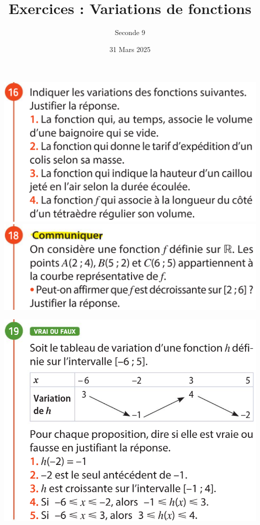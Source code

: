 \documentclass{article}
\title{Exercices : Variations de fonctions}
\author{Seconde 9}
\date{31 Mars 2025}
\begin{document}
\maketitle

\begin{center}
\begin{minipage}{0.45\textwidth}
\includegraphics[width=\textwidth]{Exercice_3.png}    
\includegraphics[width=\textwidth]{Exercice_4.png}
\end{minipage}
\hfill\vline\hfill
\begin{minipage}{0.45\textwidth}    
\includegraphics[width=\textwidth]{Exercice_5.png}

\end{minipage}
\end{center}
\end{document}

